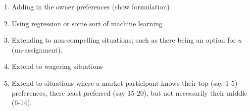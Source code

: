 \begin{enumerate}
\item Adding in the owner preferences (show formulation)

\item Using regression or some sort of machine learning

\item Extending to non-compelling situations; such as there being an option for $u$ (un-assignment).

\item Extend to wagering situations

\item Extend to situations where a market participant knows their top (say 1-5) preferences, there least preferred (say 15-20), but not necessarily their middle (6-14).

\end{enumerate}